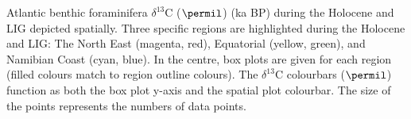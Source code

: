 Atlantic benthic foraminifera $\delta^{13}$C ($\permil$) (ka BP) during the Holocene and LIG depicted spatially. Three specific regions are highlighted during the Holocene and LIG: The North East (magenta, red), Equatorial (yellow, green), and Namibian Coast (cyan, blue). In the centre, box plots are given for each region (filled colours match to region outline colours). The $\delta^{13}$C colourbars ($\permil$) function as both the box plot y-axis and the spatial plot colourbar. The size of the points represents the numbers of data points.